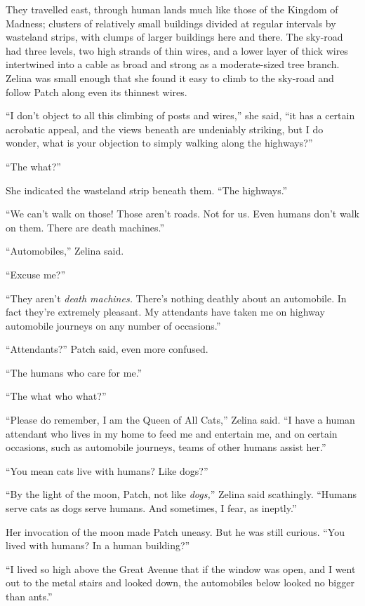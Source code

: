 \documentclass[ebook,oneside,openany,12pt]{memoir}
\begin{document}
They travelled east, through human lands much like those of the
Kingdom of Madness; clusters of relatively small buildings divided at
regular intervals by wasteland strips, with clumps of larger buildings
here and there. The sky-road had three levels, two high strands of
thin wires, and a lower layer of thick wires intertwined into a cable
as broad and strong as a moderate-sized tree branch. Zelina was small
enough that she found it easy to climb to the sky-road and follow
Patch along even its thinnest wires.

“I don’t object to all this climbing of posts and wires,” she said,
“it has a certain acrobatic appeal, and the views beneath are
undeniably striking, but I do wonder, what is your objection to simply
walking along the highways?”

“The what?”

She indicated the wasteland strip beneath them. “The highways.”

“We can’t walk on those! Those aren’t roads. Not for us. Even humans
don’t walk on them. There are death machines.”

“Automobiles,” Zelina said.

“Excuse me?”

“They aren’t \emph{death machines.} There’s nothing deathly about an
automobile. In fact they’re extremely pleasant. My attendants have
taken me on highway automobile journeys on any number of occasions.”

“Attendants?” Patch said, even more confused.

“The humans who care for me.”

“The what who what?”

“Please do remember, I am the Queen of All Cats,” Zelina said. “I have
a human attendant who lives in my home to feed me and entertain me,
and on certain occasions, such as automobile journeys, teams of other
humans assist her.”

“You mean cats live with humans? Like dogs?”

“By the light of the moon, Patch, not like \emph{dogs,}” Zelina said
scathingly. “Humans serve cats as dogs serve humans. And sometimes, I
fear, as ineptly.”

Her invocation of the moon made Patch uneasy. But he was still
curious. “You lived with humans? In a human building?”

“I lived so high above the Great Avenue that if the window was open,
and I went out to the metal stairs and looked down, the automobiles
below looked no bigger than ants.”
\end{document}
